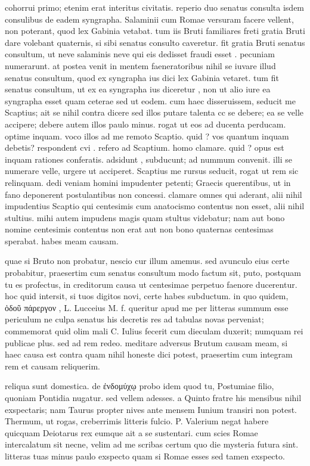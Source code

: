  cohorrui primo; etenim erat interitus civitatis. reperio duo senatus consulta isdem consulibus de eadem syngrapha. Salaminii cum Romae versuram facere vellent, non poterant, quod lex Gabinia vetabat. tum iis Bruti familiares freti gratia Bruti dare volebant quaternis, si sibi senatus consulto caveretur. fit gratia Bruti senatus consultum, ut neve salaminis neve qui eis dedisset fraudi esset . pecuniam numerarunt. at postea venit in mentem faeneratoribus nihil se iuvare illud senatus consultum, quod ex syngrapha ius dici lex Gabinia vetaret. tum fit senatus consultum, ut ex ea syngrapha ius diceretur , non ut alio iure ea syngrapha esset quam ceterae sed ut eodem. cum haec disseruissem, seducit me Scaptius; ait se nihil contra dicere sed illos putare talenta cc se debere; ea se velle accipere; debere autem illos paulo minus. rogat ut eos ad ducenta perducam. optime inquam. voco illos ad me remoto Scaptio. quid ? vos quantum inquam debetis? respondent cvi . refero ad Scaptium. homo clamare. quid ? opus est inquam rationes conferatis. adsidunt , subducunt; ad nummum convenit. illi se numerare velle, urgere ut acciperet. Scaptius me rursus seducit, rogat ut rem sic relinquam. dedi veniam homini impudenter petenti; Graecis querentibus, ut in fano deponerent postulantibus non concessi. clamare omnes qui aderant, alii nihil impudentius Scaptio qui centesimis cum anatocismo contentus non esset, alii nihil stultius. mihi autem impudens magis quam stultus videbatur; nam aut bono nomine centesimis contentus non erat aut non bono quaternas centesimas sperabat. habes meam causam.

 quae si Bruto non probatur, nescio cur illum amemus. sed avunculo eius certe probabitur, praesertim cum senatus consultum modo factum sit, puto, postquam tu es profectus, in creditorum causa ut centesimae perpetuo faenore ducerentur. hoc quid intersit, si tuos digitos novi, certe habes subductum. in quo quidem, ὁδοῦ πάρεργον , L. Lucceius M. f. queritur apud me per litteras summum esse periculum ne culpa senatus his decretis res ad tabulas novas perveniat; commemorat quid olim mali C. Iulius fecerit cum dieculam duxerit; numquam rei publicae plus. sed ad rem redeo. meditare adversus Brutum causam meam, si haec causa est contra quam nihil honeste dici potest, praesertim cum integram rem et causam reliquerim.

 reliqua sunt domestica. de ἐνδομύχῳ probo idem quod tu, Postumiae filio, quoniam Pontidia nugatur. sed vellem adesses. a Quinto fratre his mensibus nihil exspectaris; nam Taurus propter nives ante mensem Iunium transiri non potest. Thermum, ut rogas, creberrimis litteris fulcio. P. Valerium negat habere quicquam Deiotarus rex eumque ait a se sustentari. cum scies Romae intercalatum sit necne, velim ad me scribas certum quo die mysteria futura sint. litteras tuas minus paulo exspecto quam si Romae esses sed tamen exspecto.
